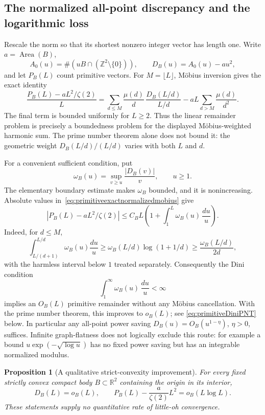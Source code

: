 \documentclass[11pt,a4paper]{article}
\numberwithin{equation}{section}
\newtheorem{proposition}[theorem]{Proposition}
\theoremstyle{definition}
\theoremstyle{remark}
\begin{document}
\subsection{The normalized all-point discrepancy and the logarithmic loss}
\label{subsec:mobiusmodulus}

Rescale the norm so that its shortest nonzero integer vector has length one.
Write $a=\operatorname{Area}(B)$,
\[
 A_0(u)=\#(uB\cap(\mathbb Z^2\setminus\{0\})),\qquad
 D_B(u)=A_0(u)-a u^2,
\]
and let $P_B(L)$ count primitive vectors. For $M=\lfloor L\rfloor$,
M\"obius inversion gives the exact identity
\begin{equation}
 \frac{P_B(L)-aL^2/\zeta(2)}{L}
 =\sum_{d\le M}\frac{\mu(d)}d\,
       \frac{D_B(L/d)}{L/d}
   -aL\sum_{d>M}\frac{\mu(d)}{d^2}.
 \label{eq:primitiveexactnormalizedmobius}
\end{equation}
The final term is bounded uniformly for $L\ge2$. Thus the linear
remainder problem is precisely a boundedness problem for the displayed
M\"obius-weighted harmonic sum. The prime number theorem alone does not
bound it: the geometric weight $D_B(L/d)/(L/d)$ varies with both $L$ and $d$.

For a convenient sufficient condition, put
\[
 \omega_B(u)=\sup_{v\ge u}\frac{|D_B(v)|}{v},\qquad u\ge1.
\]
The elementary boundary estimate makes $\omega_B$ bounded, and it is
nonincreasing. Absolute values in~\eqref{eq:primitiveexactnormalizedmobius}
give
\begin{equation}
 |P_B(L)-aL^2/\zeta(2)|
 \le C_B L\left(1+\int_1^L\omega_B(u)\,\frac{du}{u}\right).
 \label{eq:primitiveDini}
\end{equation}
Indeed, for $d\le M$,
\[
 \int_{L/(d+1)}^{L/d}\omega_B(u)\frac{du}{u}
 \ge\omega_B(L/d)\log(1+1/d)
 \ge\frac{\omega_B(L/d)}{2d},
\]
with the harmless interval below $1$ treated separately.
Consequently the Dini condition
\[
 \int_1^\infty\omega_B(u)\,\frac{du}{u}<\infty
\]
implies an $O_B(L)$ primitive remainder without any M\"obius cancellation.
With the prime number theorem, this improves to $o_B(L)$; see
\eqref{eq:primitiveDiniPNT} below.
In particular any all-point power saving $D_B(u)=O_B(u^{1-\eta})$,
$\eta>0$, suffices. Infinite graph-flatness does not logically exclude
this route: for example a bound $u\exp(-\sqrt{\log u})$ has no fixed
power saving but has an integrable normalized modulus.

\begin{proposition}[A qualitative strict-convexity improvement]
\label{prop:strictconvexlittleo}
For every fixed strictly convex compact body $B\subset\mathbb R^2$
containing the origin in its interior,
\[
 D_B(L)=o_B(L),\qquad
 P_B(L)-\frac{a}{\zeta(2)}L^2=o_B(L\log L).
\]
These statements supply no quantitative rate of little-oh convergence.
\end{proposition}
\end{document}
